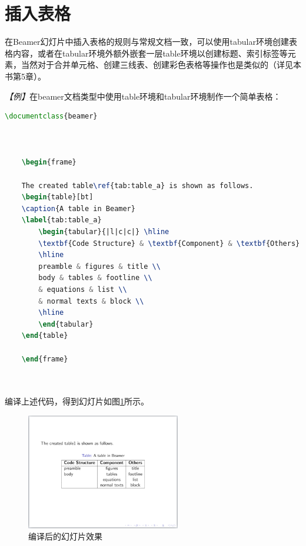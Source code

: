 \section{插入表格}

在Beamer幻灯片中插入表格的规则与常规文档一致，可以使用tabular环境创建表格内容，或者在tabular环境外额外嵌套一层table环境以创建标题、索引标签等元素，当然对于合并单元格、创建三线表、创建彩色表格等操作也是类似的（详见本书第5章）。

\emph{【例】}在beamer文档类型中使用table环境和tabular环境制作一个简单表格：
\begin{lstlisting}[language=TeX]
    \documentclass{beamer}

    

    \begin{frame}

    The created table\ref{tab:table_a} is shown as follows.
    \begin{table}[bt]
    \caption{A table in Beamer}
    \label{tab:table_a}
        \begin{tabular}{|l|c|c|} \hline
        \textbf{Code Structure} & \textbf{Component} & \textbf{Others} \\
        \hline
        preamble & figures & title \\
        body & tables & footline \\
        & equations & list \\
        & normal texts & block \\
        \hline
        \end{tabular}
    \end{table}

    \end{frame}

    
\end{lstlisting}

编译上述代码，得到幻灯片如图\ref{fig:939}所示。

\begin{figure}[htbp]
    \centering
    \includegraphics[width = 0.6\textwidth]{images/ch_9/eg1.png}
    \caption{编译后的幻灯片效果}
    \label{fig:939}
\end{figure}

